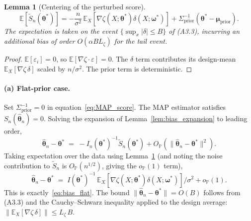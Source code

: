 \documentclass[12pt]{article}
\theoremstyle{plain}
\newtheorem{lemma}[theorem]{Lemma}
\theoremstyle{definition}
\theoremstyle{remark}
\newcommand{\E}{\mathbb{E}}
\newcommand{\norm}[1]{\lVert #1 \rVert}
\begin{document}
\begin{lemma}[Centering of the perturbed score]\label{lem:score_mean}
\[
\E[\tilde S_n(\boldsymbol\theta^*)]
= -\frac{n}{\sigma^2}\,
  \E_X[\nabla\zeta(X;\boldsymbol\theta^*)\delta(X;\boldsymbol\omega^*)]
  +\Sigma_{\mathrm{prior}}^{-1}
    (\boldsymbol\theta^*-\boldsymbol\mu_{\mathrm{prior}}).
\]
The expectation is taken on the event $\{\sup_x|\delta|\le B\}$ of
(A3.3), incurring an additional bias of order $O(\alpha B L_\zeta)$ for
the tail event.
\end{lemma}

\begin{proof}
$\E[\varepsilon_i]=0$, so $\E[\nabla\zeta\cdot\varepsilon]=0$.  The
$\delta$ term contributes its design-mean
$\E_X[\nabla\zeta\,\delta]$ scaled by $n/\sigma^2$.  The prior term is
deterministic.
\end{proof}

\paragraph{(a) Flat-prior case.}  Set $\Sigma_{\mathrm{prior}}^{-1}=0$
in equation~\eqref{eq:MAP_score}.  The MAP estimator satisfies
$S_n(\hat{\boldsymbol\theta}_n)=0$.  Solving the expansion of
Lemma~\ref{lem:bias_expansion} to leading order,
\[
   \hat{\boldsymbol\theta}_n - \boldsymbol\theta^*
    \;=\; -I_n(\boldsymbol\theta^*)^{-1}\tilde S_n(\boldsymbol\theta^*)
        + O_{\mathbb{P}}(\norm{\hat{\boldsymbol\theta}_n-\boldsymbol\theta^*}^2).
\]
Taking expectation over the data using Lemma~\ref{lem:score_mean} (and
noting the noise contribution to $\tilde S_n$ is $O_{\mathbb{P}}(n^{1/2})$,
giving the $o_{\mathbb{P}}(1)$ term),
\[
  \hat{\boldsymbol\theta}_n - \boldsymbol\theta^*
   \;=\; I(\boldsymbol\theta^*)^{-1}\,
       \E_X[\nabla\zeta(X;\boldsymbol\theta^*)\delta(X;\boldsymbol\omega^*)]/\sigma^2
       + o_{\mathbb{P}}(1).
\]
This is exactly~\eqref{eq:bias_flat}.  The bound
$\norm{\hat{\boldsymbol\theta}_n-\boldsymbol\theta^*}=O(B)$ follows
from (A3.3) and the Cauchy--Schwarz inequality applied to the design
average:
$\norm{\E_X[\nabla\zeta\,\delta]}\le L_\zeta\,B$.
\end{document}
